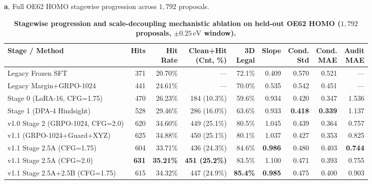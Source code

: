 \documentclass[11pt,a4paper]{article}
\begin{document}
\begin{table}[!h]
  \centering
  \caption{\textbf{Stagewise progression and scale-decoupling mechanistic ablation on held-out OE62 HOMO ($1{,}792$ proposals, $\pm 0.25\,\text{eV}$ window).}}
  \label{tab:ed_oe62}
  \scriptsize
  \setlength{\tabcolsep}{2.4pt}
  \textbf{a}, Full OE62 HOMO stagewise progression across $1{,}792$ proposals.\\[2pt]
  \begin{tabular}{lrrrrrrrr}
    \toprule
    Stage / Method & Hits & \shortstack[r]{Hit\\Rate} & \shortstack[r]{Clean+Hit\\(Cnt, \%)} & \shortstack[r]{3D\\Legal} & Slope & \shortstack[r]{Cond.\\Std} & \shortstack[r]{Cond.\\MAE} & \shortstack[r]{Audit\\MAE} \\
    \midrule
    Legacy Frozen SFT & 371 & 20.70\% & --- & 72.1\% & 0.409 & 0.570 & 0.521 & --- \\
    Legacy Margin+GRPO-1024 & 441 & 24.61\% & --- & 70.0\% & 0.535 & 0.542 & 0.451 & --- \\
    Stage 0 (LoRA-16, CFG=1.75) & 470 & 26.23\% & 184 (10.3\%) & 59.6\% & 0.934 & 0.420 & 0.347 & 1.536 \\
    Stage 1 (DPA-4 Hindsight) & 528 & 29.46\% & 286 (16.0\%) & 63.6\% & 0.933 & \textbf{0.418} & \textbf{0.339} & 1.137 \\
    v1.0 Stage 2 (GRPO-1024, CFG=2.0) & 620 & 34.60\% & 449 (25.1\%) & 80.5\% & 1.045 & 0.439 & 0.364 & 0.757 \\
    v1.1 (GRPO-1024+Guard+XYZ) & 625 & 34.88\% & 450 (25.1\%) & 80.1\% & 1.037 & 0.427 & 0.353 & 0.825 \\
    v1.1 Stage 2.5A (CFG=1.75) & 604 & 33.71\% & 436 (24.3\%) & 84.6\% & \textbf{0.986} & 0.480 & 0.403 & \textbf{0.744} \\
    v1.1 Stage 2.5A (CFG=2.0) & \textbf{631} & \textbf{35.21\%} & \textbf{451 (25.2\%)} & 83.5\% & 1.100 & 0.471 & 0.393 & 0.755 \\
    v1.1 Stage 2.5A+2.5B (CFG=1.75) & 615 & 34.32\% & 447 (24.9\%) & \textbf{85.4\%} & \textbf{0.985} & 0.475 & 0.400 & 0.903 \\
    \bottomrule
  \end{tabular}


\end{table}
\end{document}
